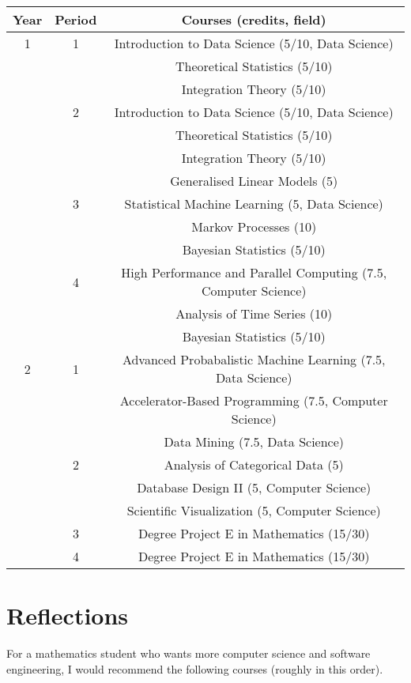 \documentclass{article}
\begin{document}
  \begin{longtable}{|c|c|c|}
    \hline
    Year & Period & Courses (credits, field) \\
    \hline
    1 & 1 & Introduction to Data Science (5/10, Data Science) \\
      &   & Theoretical Statistics (5/10) \\
      &   & Integration Theory (5/10) \\
    \hline
      & 2 & Introduction to Data Science (5/10, Data Science) \\
      &   & Theoretical Statistics (5/10) \\
      &   & Integration Theory (5/10) \\
      &   & Generalised Linear Models (5) \\
    \hline
      & 3 & Statistical Machine Learning (5, Data Science) \\
      &   & Markov Processes (10) \\
      &   & Bayesian Statistics (5/10) \\
    \hline
      & 4 & High Performance and Parallel Computing (7.5, Computer Science) \\
      &   & Analysis of Time Series (10) \\
      &   & Bayesian Statistics (5/10) \\
    \hline
    2 & 1 & Advanced Probabalistic Machine Learning (7.5, Data Science) \\
      &   & Accelerator-Based Programming (7.5, Computer Science) \\
      &   & Data Mining (7.5, Data Science) \\
    \hline
      & 2 & Analysis of Categorical Data (5) \\
      &   & Database Design II (5, Computer Science) \\
      &   & Scientific Visualization (5, Computer Science) \\
    \hline
      & 3 & Degree Project E in Mathematics (15/30) \\
    \hline
      & 4 & Degree Project E in Mathematics (15/30) \\
    \hline
  \end{longtable}

  \section{Reflections}

  For a mathematics student who wants more computer science and software engineering, I would recommend the following courses (roughly in this order).
\end{document}
